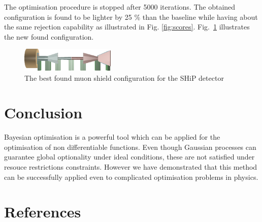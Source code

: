 \documentclass[a4paper]{jpconf}
\theoremstyle{my_theorem_style}
\numberwithin{equation}{section}
\begin{document}
The optimisation procedure is stopped after 5000 iterations. 
The obtained configuration is found to be lighter by 25 \% than the
baseline while having about  the same rejection capability as illustrated in
Fig. \ref{fig:scores}.
Fig.~\ref{fig:sub2} illustrates the new found configuration.

\begin{figure}[tbh]
\centering
\includegraphics[width=0.4\textwidth]{pics/sol_2.png}
  \caption{\label{fig:sub2} The best found muon shield configuration
   for the SHiP detector}
\end{figure}

 
\section{Conclusion}

Bayesian optimisation is a powerful tool which can be applied for the optimisation of non differentiable functions. Even though Gaussian processes can guarantee global optionality under ideal conditions, these are not satisfied under resouce restrictions constraints. However we have demonstrated that this method can be successfully applied even to complicated optimisation problems in physics.


\section*{References}
\end{document}
